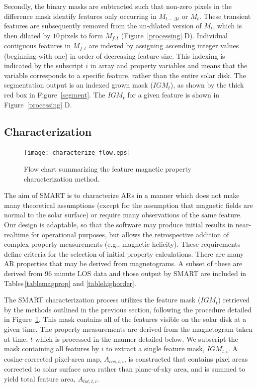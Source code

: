 Secondly, the binary masks are subtracted such that non-zero pixels in the difference mask identify features only occurring in $M_{t-\Delta t}$ or $M_{t}$. These transient features are subsequently removed from the un-dilated version of $M_{t}$, which is then dilated by $10$\,pixels to form $M_{f,t}$ (Figure~\ref{processing} D). Individual contiguous features in $M_{f,t}$ are indexed by assigning ascending integer values (beginning with one) in order of decreasing feature size. This indexing is indicated by the subscript $i$ in array and property variables and means that the variable corresponds to a specific feature, rather than the entire solar disk.  The segmentation output is an indexed grown mask ($IGM_{t}$), as shown by the thick red box in Figure~\ref{segment}. The $IGM_{t}$ for a given feature is shown in Figure~\ref{processing} D.


\subsection{Characterization}\label{magprop}

\begin{figure}[!t]
\centerline{\texttt{[image: characterize\_flow.eps]}}
\caption[The SMART characterisation method.]{Flow chart summarizing the feature magnetic property characterization method.}
\label{flow_char}
\end{figure}

The aim of \gls{SMART} is to characterize \glspl{AR} in a manner which does not make many theoretical assumptions (except for the assumption that magnetic fields are normal to the solar surface) or require many observations of the same feature.  Our design is adaptable, so that the software may produce initial results in near-realtime for operational purposes, but allows the retrospective addition of complex property measurements (e.g., magnetic helicity). These requirements define criteria for the selection of initial property calculations. There are many \gls{AR} properties that may be derived from magnetograms. A subset of these are derived from 96 minute \gls{LOS} data and those output by \gls{SMART} are included in Tables\,\ref{tablemagprop} and \ref{tablehighorder}. 

The \gls{SMART} characterization process utilizes the feature mask ($IGM_{t}$) retrieved by the methods outlined in the previous section, following the procedure detailed in Figure~\ref{flow_char}. This mask contains all of the features visible on the solar disk at a given time. The property measurements are derived from the magnetogram taken at time, $t$ which is processed in the manner detailed below. We subscript the mask containing all features by $i$ to extract a single feature mask, $IGM_{t,i}$. A cosine-corrected pixel-area map, $A_{cos,t,i}$,  is constructed that contains pixel areas corrected to solar surface area rather than plane-of-sky area, and is summed to yield total feature area, $A_{tot,t,i}$. 

